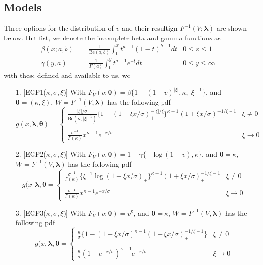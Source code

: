 \documentclass{article}
\theoremstyle{definition}
\theoremstyle{definition}
\def\lam{\boldsymbol{\lambda}}
\def\thet{\boldsymbol{\theta}}
\def\k{\kappa}
\begin{document}
\subsection{Models}
Three options for the distribution of $v$ and their resultign $F^{-1}(V;\lam)$ are shown below. But fist, we denote the incomplete beta and gamma functions as 
\begin{align*}
    \beta(x;a,b)&=\frac{1}{\text{Be}(a,b)} \int_{0}^x t^{a-1}(1-t)^{b-1}dt & 0\leq x\leq 1\\
    \gamma(y,a)&=\frac{1}{\Gamma(a)}\int_{0}^yt^{a-1}e^{-t}dt & 0\leq y\leq \infty
\end{align*}
with these defined and available to us, we 
\begin{enumerate}
    \item  [1.] [EGP1($\k, \sigma,\xi)$] With $F_V(v;\thet)=\beta\{1-(1-v)^{|\xi|},\k,|\xi|^{-1}\}$, and $\thet =(\kappa,\xi)$, $W=F^{-1}(V,\lam)$ has the following pdf
    \[g(x,\lam,\thet)=\begin{cases} \frac{|\xi|/\sigma}{\text{Be}(\k, |\xi|^{-1})}\{1-(1+\xi x/\sigma)_+^{-|\xi|/\xi}\}^{\k-1} (1+\xi x/\sigma)_+^{-1/\xi-1} & \xi \neq 0\\\\
    \frac{\sigma^{-1}}{\Gamma(\k)}x^{\k-1}e^{-x/\sigma} & \xi \rightarrow 0
    \end{cases}\]
    
    \item [2.][EGP2($\k, \sigma,\xi)$] With $F_V(v,\thet)=1-\gamma\{-\log(1-v),\k\}$, and $\thet= \k$,  $W=F^{-1}(V,\lam)$ has the following pdf
    \[g(x,\lam,\thet= \begin{cases}\frac{\sigma^{-1}}{\Gamma(\k)}\{\xi^{-1}\log(1+\xi x/\sigma)_+\}^{\k-1} (1+\xi x/\sigma)_+^{-1/\xi-1} & \xi\neq 0\\\\
    \frac{\sigma^{-1}}{\Gamma(\k)}x^{\k-1}e^{-x/\sigma} & \xi\rightarrow 0
    \end{cases}\]
    \item [3.] [EGP3($\k, \sigma,\xi)$] With $F_V(v;\thet)= v^\k$, and $\thet= \k$, $W=F^{-1}(V,\lam)$ has the following pdf
    \[g(x,\lam,\thet= \begin{cases} \frac{\k}{\sigma}\{1-(1+\xi x/\sigma)^{\k-1}(1+\xi x/\sigma)_+^{-1/\xi-1}\} & \xi \neq 0\\\\
    \frac{\k}{\sigma}(1-e^{-x/\sigma})^{\k-1}e^{-x/\sigma} & \xi \rightarrow 0
    \end{cases}\]
\end{enumerate}
\end{document}
